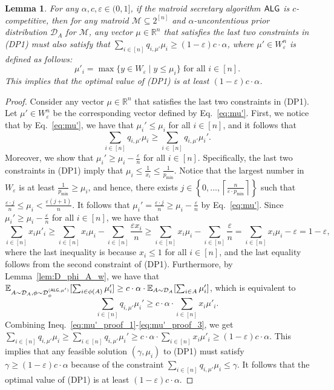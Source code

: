 \documentclass[11pt]{article}
\newcommand{\ceil}[1]{\left\lceil #1 \right\rceil}
\newcommand{\D}{\mathcal D}
\def \E {\mathbb{E}}
\newcommand{\M}{{\mathcal M}}
\newcommand{\alg}{\textnormal{\sffamily ALG}}
\newcommand{\eps}{\varepsilon}
\newcommand{\R}{{\mathbb R}}
\newtheorem{lemma}[theorem]{Lemma}
\begin{document}
\begin{lemma}\label{lem:secretary_to_crs_dual}
For any $\alpha,c,\eps\in(0,1]$, if the matroid secretary algorithm $\alg$ is $c$-competitive, then for any matroid $\M\subseteq2^{[n]}$ and $\alpha$-uncontentious prior distribution $\D_A$ for $\M$, any vector $\mu\in\R^n$ that satisfies the last two constraints in (DP1) must also satisfy that $\sum_{i\in[n]} q_{i,\mu'}\mu_i\ge(1-\eps)c\cdot\alpha$, where $\mu'\in W_{\eps}^n$ is defined as follows:
\begin{equation}\label{eq:mu'}
\mu'_i=\max\{y\in W_{\eps}\mid y\le\mu_i\} \textrm{ for all } i\in[n].
\end{equation}
This implies that the optimal value of (DP1) is at least $(1-\eps)c\cdot\alpha$.
\end{lemma}
\begin{proof}
Consider any vector $\mu\in\R^n$ that satisfies the last two constraints in (DP1). Let $\mu'\in W_{\eps}^n$ be the corresponding vector defined by Eq.~\eqref{eq:mu'}. First, we notice that by Eq.~\eqref{eq:mu'}, we have that $\mu_i'\le\mu_i$ for all $i\in[n]$, and it follows that
\begin{equation}\label{eq:mu'_proof_1}
    \sum_{i\in[n]} q_{i,\mu'}\mu_i\ge\sum_{i\in[n]} q_{i,\mu'}\mu_i'.
\end{equation}
Moreover, we show that $\mu_i'\ge\mu_i-\frac{\eps}{n}$ for all $i\in[n]$. Specifically, the last two constraints in (DP1) imply that $\mu_i\le\frac{1}{x_i}\le\frac{1}{p_{\min}}$. Notice that the largest number in $W_{\eps}$ is at least $\frac{1}{p_{\min}}\ge\mu_i$, and hence, there exists $j\in\left\{0,\dots,\ceil{\frac{n}{\eps\cdot p_{\min}}}\right\}$ such that $\frac{\eps\cdot j}{n}\le\mu_i<\frac{\eps(j+1)}{n}$. It follows that $\mu_i'=\frac{\eps\cdot j}{n}\ge\mu_i-\frac{\eps}{n}$ by Eq.~\eqref{eq:mu'}. Since $\mu_i'\ge\mu_i-\frac{\eps}{n}$ for all $i\in[n]$, we have that
\begin{equation}\label{eq:mu'_proof_2}
    \sum_{i\in[n]}x_i\mu'_i\ge\sum_{i\in[n]}x_i\mu_i-\sum_{i\in[n]}\frac{\eps x_i}{n}\ge\sum_{i\in[n]}x_i\mu_i-\sum_{i\in[n]}\frac{\eps}{n}=\sum_{i\in[n]}x_i\mu_i-\eps=1-\eps,
\end{equation}
where the last inequality is because $x_i\le 1$ for all $i\in[n]$, and the last equality follows from the second constraint of (DP1). Furthermore, by Lemma~\ref{lem:D_phi_A_w}, we have that $\E_{A\sim\D_A,\phi\sim\D_{\phi}^{(\alg,\mu')}}[\sum_{i\in\phi(A)} \mu'_i]\ge c\cdot\alpha\cdot\E_{A\sim\D_A}[\sum_{i\in A} \mu'_i]$, which is equivalent to 
\begin{equation}\label{eq:mu'_proof_3}
    \sum_{i\in[n]} q_{i,\mu'}\mu_i'\ge c\cdot\alpha\cdot\sum_{i\in[n]}x_i\mu'_i.
\end{equation}
Combining Ineq.~\eqref{eq:mu'_proof_1}-\eqref{eq:mu'_proof_3}, we get $\sum_{i\in[n]} q_{i,\mu'}\mu_i\ge\sum_{i\in[n]} q_{i,\mu'}\mu_i'\ge c\cdot\alpha\cdot\sum_{i\in[n]}x_i\mu'_i\ge(1-\eps)c\cdot\alpha$. This implies that any feasible solution $(\gamma,\mu_i)$ to (DP1) must satisfy $\gamma\ge(1-\eps)c\cdot\alpha$ because of the constraint $\sum_{i\in[n]} q_{i,\mu'}\mu_i\le\gamma$. It follows that the optimal value of (DP1) is at least $(1-\eps)c\cdot\alpha$.
\end{proof}
\end{document}
